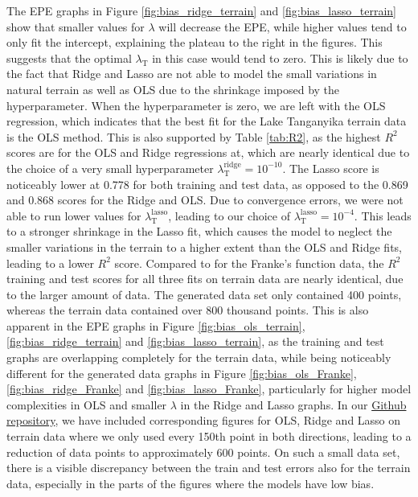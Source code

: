 \documentclass[a4paper, 10pt]{article}
\begin{document}
\begin{multicols}{2}
The EPE graphs in Figure \ref{fig:bias_ridge_terrain} and \ref{fig:bias_lasso_terrain} show that smaller values for $\lambda$ will decrease the EPE, while higher values tend to only fit the intercept, explaining the plateau to the right in the figures. This suggests that the optimal $\lambda_\text{T}$ in this case would tend to zero. This is likely due to the fact that Ridge and Lasso are not able to model the small variations in natural terrain as well as OLS due to the shrinkage imposed by the hyperparameter. When the hyperparameter is zero, we are left with the OLS regression, which indicates that the best fit for the Lake Tanganyika terrain data is the OLS method. This is also supported by Table \ref{tab:R2}, as the highest $R^2$ scores are for the OLS and Ridge regressions at, which are nearly identical due to the choice of a very small hyperparameter $\lambda_\text{T}^\text{ridge}=10^{-10}$. The Lasso score is noticeably lower at 0.778 for both training and test data, as opposed to the 0.869 and 0.868 scores for the Ridge and OLS. Due to convergence errors, we were not able to run lower values for $\lambda_\text{T} ^\text{lasso}$, leading to our choice of $\lambda_\text{T} ^\text{lasso}=10^{-4}$. This leads to a stronger shrinkage in the Lasso fit, which causes the model to neglect the smaller variations in the terrain to a higher extent than the OLS and Ridge fits, leading to a lower $R^2$ score. Compared to for the Franke's function data, the $R^2$ training and test scores for all three fits on terrain data are nearly identical, due to the larger amount of data. The generated data set only contained 400 points, whereas the terrain data contained over 800 thousand points.  This is also apparent in the EPE graphs in Figure \ref{fig:bias_ols_terrain}, \ref{fig:bias_ridge_terrain} and \ref{fig:bias_lasso_terrain}, as the training and test graphs are overlapping completely for the terrain data, while being noticeably different for the generated data graphs in Figure \ref{fig:bias_ols_Franke}, \ref{fig:bias_ridge_Franke} and \ref{fig:bias_lasso_Franke}, particularly for higher model complexities in OLS  and smaller $\lambda$ in the Ridge and Lasso graphs.  In our \href{https://github.com/bernharl/FYS-STK4155-project1}{Github repository}, we have included corresponding figures for OLS, Ridge and Lasso on terrain data where we only used every 150th point in both directions, leading to a reduction of data points to approximately 600 points. On such a small data set, there is a visible discrepancy between the train and test errors also for the terrain data, especially in the parts of the figures where the models have low bias.


\end{multicols}
\end{document}
